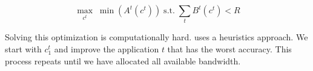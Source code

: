 
\begin{equation}
 \label{eq:multitask}
 \underset{c^t}{\max} \; \min({A^t(c^t)})
 \;
 \text{s.t.}
 \;
 \sum_t{B^t(c^t)} < R
\end{equation}


Solving this optimization is computationally hard. \sysname{} uses a heuristics
approach. We start with $c_1^t$ and improve the application $t$ that has the
worst accuracy. This process repeats until we have allocated all available
bandwidth.

